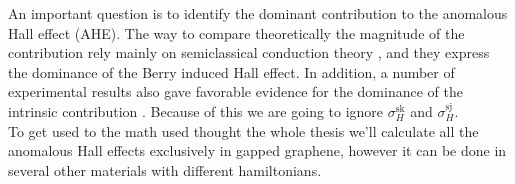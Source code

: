 An important question is to identify the dominant contribution to the anomalous Hall effect (AHE). The way to compare theoretically the magnitude of the contribution rely mainly on semiclassical conduction theory \cite{dugaev2005anomalous}, and they express the dominance of the Berry induced Hall effect. In addition, a number of experimental results also gave favorable evidence for the dominance of the intrinsic contribution \cite{tian2009proper}. Because of this we are going to ignore $\sigma_H^\textrm{sk}$ and $\sigma_H^\textrm{sj}$.\\
To get used to the math used thought the whole thesis we'll calculate all the anomalous Hall effects exclusively in gapped graphene, however it can be done in several other materials with different hamiltonians.















